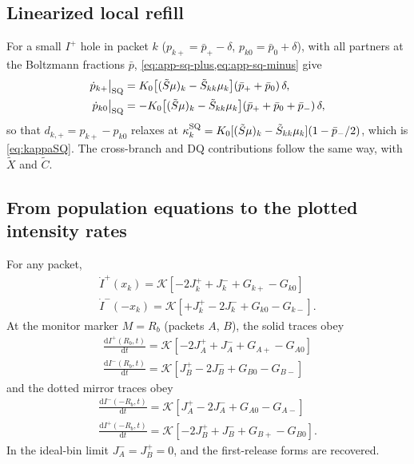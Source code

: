 \documentclass[11pt]{article}
\newcommand{\Iplus}{I^{+}}
\newcommand{\Iminus}{I^{-}}
\newcommand{\dd}{\mathrm{d}}
\begin{document}
\subsection{Linearized local refill}

For a small \(\Iplus\) hole in packet \(k\) (\(p_{k+}=\bar p_+-\delta\), \(p_{k0}=\bar p_0+\delta\)),
with all partners at the Boltzmann fractions \(\bar p\), \cref{eq:app-sq-plus,eq:app-sq-minus}
give
\begin{align}
\dot p_{k+}\big|_{\rm SQ}&=K_0\bigl[(\tilde S\mu)_k-\tilde S_{kk}\mu_k\bigr](\bar p_++\bar p_0)\,\delta,\\
\dot p_{k0}\big|_{\rm SQ}&=-K_0\bigl[(\tilde S\mu)_k-\tilde S_{kk}\mu_k\bigr](\bar p_++\bar p_0+\bar p_-)\,\delta,
\end{align}
so that \(d_{k,+}=p_{k+}-p_{k0}\) relaxes at
\(\kappa^{\rm SQ}_k=K_0[(\tilde S\mu)_k-\tilde S_{kk}\mu_k](1-\bar p_-/2)\), which is
\cref{eq:kappaSQ}. The cross-branch and DQ contributions follow the same way, with \(\tilde X\) and
\(\tilde C\).

\subsection{From population equations to the plotted intensity rates}

For any packet,
\begin{align}
  \boxed{
  \dot\Iplus(x_k)
  =\mathcal K\left[
    -2J_k^{+}+J_k^{-}+G_{k+}-G_{k0}
  \right]}
  \label{eq:app-general-Idot-plus}\\[0.4em]
  \boxed{
  \dot\Iminus(-x_k)
  =\mathcal K\left[
    +J_k^{+}-2J_k^{-}+G_{k0}-G_{k-}
  \right].}
  \label{eq:app-general-Idot-minus}
\end{align}
At the monitor marker \(M=R_b\) (packets \(A\), \(B\)), the solid traces obey
\begin{align}
  \boxed{
  \frac{\dd\Iplus(R_b,t)}{\dd t}
  =\mathcal K\left[
    -2J_A^{+}+J_A^{-}+G_{A+}-G_{A0}
  \right]}
  \label{eq:app-direct-front-plus}\\[0.4em]
  \boxed{
  \frac{\dd\Iminus(R_b,t)}{\dd t}
  =\mathcal K\left[
    J_B^{+}-2J_B^{-}+G_{B0}-G_{B-}
  \right]}
  \label{eq:app-direct-front-minus}
\end{align}
and the dotted mirror traces obey
\begin{align}
  \boxed{
  \frac{\dd\Iminus(-R_b,t)}{\dd t}
  =\mathcal K\left[
    J_A^{+}-2J_A^{-}+G_{A0}-G_{A-}
  \right]}
  \label{eq:app-mirror-front-minus}\\[0.4em]
  \boxed{
  \frac{\dd\Iplus(-R_b,t)}{\dd t}
  =\mathcal K\left[
    -2J_B^{+}+J_B^{-}+G_{B+}-G_{B0}
  \right].}
  \label{eq:app-mirror-front-plus}
\end{align}
In the ideal-bin limit \(J^-_A=J^+_B=0\), and the first-release forms are recovered.
\end{document}
